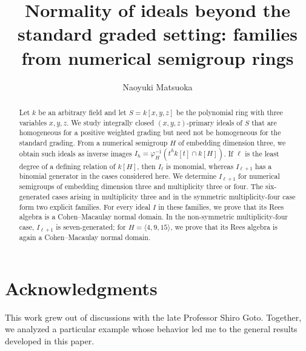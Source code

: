 \documentclass[a4paper,11pt,reqno]{amsart}
\title[Normality of ideals beyond the standard graded setting]
{Normality of ideals beyond the standard graded setting: families from numerical semigroup rings}
\author{Naoyuki Matsuoka}
\date{}
\theoremstyle{definition}
\theoremstyle{remark}
\begin{document}
\begin{abstract}
Let $k$ be an arbitrary field and let $S=k[x,y,z]$ be the polynomial ring with three variables $x,y,z$.  We study integrally
closed $(x,y,z)$-primary ideals of $S$ that are homogeneous for a positive
weighted grading but need not be homogeneous for the standard grading.  From
a numerical semigroup $H$ of embedding dimension three, we obtain such ideals
as inverse images
$I_h=\varphi_H^{-1}(t^hk[t]\cap k[H])$.  If $\ell$ is the least degree of a
defining relation of $k[H]$, then $I_\ell$ is monomial, whereas
$I_{\ell+1}$ has a binomial generator in the cases considered here.  We
determine $I_{\ell+1}$ for numerical semigroups of embedding dimension three
and multiplicity three or four.  The six-generated cases arising in
multiplicity three and in the symmetric multiplicity-four case form two
explicit families.  For every ideal $I$ in these families, we prove that its
Rees algebra is a Cohen--Macaulay normal domain.  In the non-symmetric
multiplicity-four case, $I_{\ell+1}$ is seven-generated; for
$H=\langle4,9,15\rangle$, we prove that its Rees algebra is again a
Cohen--Macaulay normal domain.
\end{abstract}

\maketitle
\tableofcontents









\section*{Acknowledgments}
This work grew out of discussions with the late Professor Shiro Goto.
Together, we analyzed a particular example whose behavior led me to the
general results developed in this paper.



\end{document}
